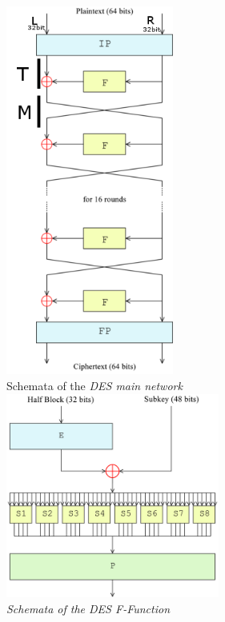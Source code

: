 \begin{minipage}{7cm}
\begin{center}
  \includegraphics[width=5.5cm]{./bilder/DES-main-network.png}\\
  Schemata of the \em DES main network \em\\
  \vspace{2mm}
  \includegraphics[width=7cm]{./bilder/DES-f-function.png}\\
  Schemata of the DES \em F\em-Function\\
 \end{center}
\end{minipage}

